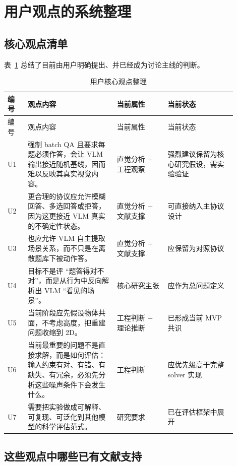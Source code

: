 \documentclass[11pt,a4paper]{ctexart}
\begin{document}
\section{用户观点的系统整理}

\subsection{核心观点清单}

表~\ref{tab:user-views} 总结了目前由用户明确提出、并已经成为讨论主线的判断。

\begin{longtable}{p{0.08\linewidth}p{0.35\linewidth}p{0.20\linewidth}p{0.27\linewidth}}
\caption{用户核心观点整理}\label{tab:user-views}\\
\toprule
编号 & 观点内容 & 当前属性 & 当前状态 \\
\midrule
\endfirsthead
\toprule
编号 & 观点内容 & 当前属性 & 当前状态 \\
\midrule
\endhead
U1 & 强制 batch QA 且要求每题必须作答，会让 VLM 输出接近随机基线，因而难以反映其真实视觉内容。 & 直觉分析 + 工程观察 & 强烈建议保留为核心研究假设，需实验验证 \\
U2 & 更合理的协议应允许模糊回答、多选回答或拒答，因为这更接近 VLM 真实的不确定性状态。 & 直觉分析 + 文献支撑 & 可直接纳入主协议设计 \\
U3 & 也应允许 VLM 自主提取场景关系，而不只是在离散题库下被动作答。 & 直觉分析 + 文献支撑 & 应保留为对照协议 \\
U4 & 目标不是评 ``题答得对不对''，而是从行为中反向解析出 VLM ``看见的场景''。 & 核心研究主张 & 应作为总问题定义 \\
U5 & 当前阶段应先假设物体共面，不考虑高度，把重建问题收缩到 2D。 & 工程判断 + 理论推断 & 已形成当前 MVP 共识 \\
U6 & 当前最重要的问题不是直接求解，而是如何评估：输入约束有对、有错、有缺失、有冗余，必须先分析这些噪声条件下会发生什么。 & 工程判断 & 应优先级高于完整 solver 实现 \\
U7 & 需要把实验做成可解释、可复现、可泛化到其他模型的科学评估范式。 & 研究要求 & 已在评估框架中展开 \\
\bottomrule
\end{longtable}

\subsection{这些观点中哪些已有文献支持}
\end{document}
